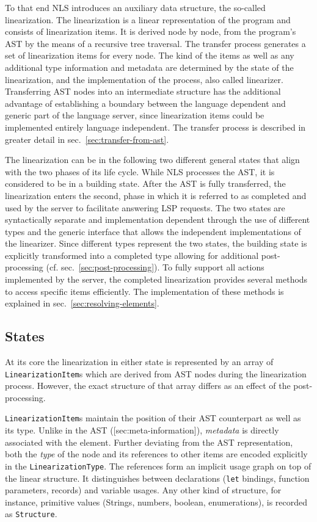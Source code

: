 \documentclass[
  a4paper,
  bibtex,
  english,
  nomenclature]{kthlatex/kththesis/kththesis}
\begin{document}
To that end NLS introduces an auxiliary data structure, the so-called
linearization. The linearization is a linear representation of the
program and consists of linearization items. It is derived node by node,
from the program's AST by the means of a recursive tree traversal. The
transfer process generates a set of linearization items for every node.
The kind of the items as well as any additional type information and
metadata are determined by the state of the linearization, and the
implementation of the process, also called linearizer. Transferring AST
nodes into an intermediate structure has the additional advantage of
establishing a boundary between the language dependent and generic part
of the language server, since linearization items could be implemented
entirely language independent. The transfer process is described in
greater detail in sec.~\ref{sec:transfer-from-ast}.

The linearization can be in the following two different general states
that align with the two phases of its life cycle. While NLS processes
the AST, it is considered to be in a building state. After the AST is
fully transferred, the linearization enters the second, phase in which
it is referred to as completed and used by the server to facilitate
answering LSP requests. The two states are syntactically separate and
implementation dependent through the use of different types and the
generic interface that allows the independent implementations of the
linearizer. Since different types represent the two states, the building
state is explicitly transformed into a completed type allowing for
additional post-processing (cf. sec.~\ref{sec:post-processing}). To
fully support all actions implemented by the server, the completed
linearization provides several methods to access specific items
efficiently. The implementation of these methods is explained in
sec.~\ref{sec:resolving-elements}.

\hypertarget{sec:states}{%
\subsection{States}\label{sec:states}}

At its core the linearization in either state is represented by an array
of \texttt{LinearizationItem}s which are derived from AST nodes during
the linearization process. However, the exact structure of that array
differs as an effect of the post-processing.

\texttt{LinearizationItem}s maintain the position of their AST
counterpart as well as its type. Unlike in the AST
({[}sec:meta-information{]}), \emph{metadata} is directly associated
with the element. Further deviating from the AST representation, both
the \emph{type} of the node and its references to other items are
encoded explicitly in the \texttt{LinearizationType}. The references
form an implicit usage graph on top of the linear structure. It
distinguishes between declarations (\texttt{let} bindings, function
parameters, records) and variable usages. Any other kind of structure,
for instance, primitive values (Strings, numbers, boolean,
enumerations), is recorded as \texttt{Structure}.
\end{document}

